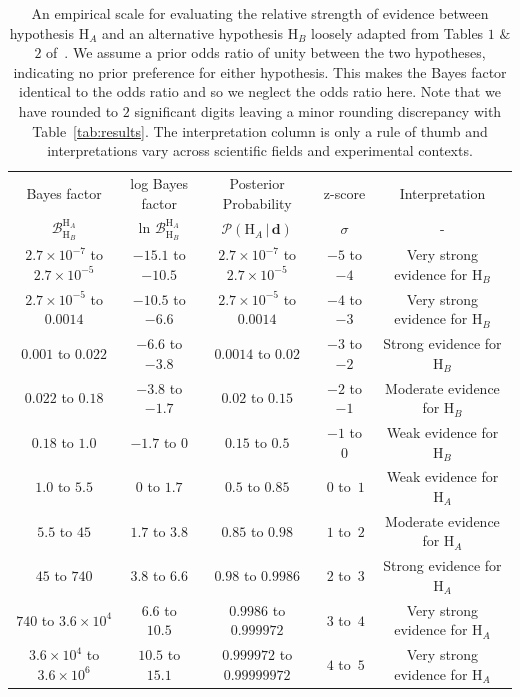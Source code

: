 \newpage
\begin{table}
\centering
\begin{tabularx}{1.0\textwidth}{c|c|c|c|c}
\hline\hline
Bayes factor & log Bayes factor & Posterior Probability & z-score & Interpretation \\
$\mathcal{B}^{\mathrm{H}_A}_{\mathrm{H}_B}$ & ln $\mathcal{B}^{\mathrm{H}_A}_{\mathrm{H}_B}$ & $\mathcal{P} \left(\mathrm{H}_A \, | \, \mathbf{d} \right)$ & $\sigma$ & - \\
\hline\hline
$2.7 \times 10^{-7}$ to $2.7 \times 10^{-5}$ & $-15.1$ to $-10.5$ & $2.7 \times 10^{-7}$ to $2.7 \times 10^{-5}$ & $-5$ to $-4$ & Very strong evidence for $\mathrm{H}_{B}$\\
$2.7 \times 10^{-5}$ to $0.0014$ & $-10.5$ to $-6.6$ & $2.7 \times 10^{-5}$ to $0.0014$ & $-4$ to $-3$ & Very strong evidence for $\mathrm{H}_B$ \\
$0.001$ to $0.022$ & $-6.6$ to $-3.8$ & $0.0014$ to $0.02$ & $-3$ to $-2$ & Strong evidence for $\mathrm{H}_B$ \\
$0.022$ to $0.18$ & $-3.8$ to $-1.7$ & $0.02$ to $0.15$ & $-2$ to $-1$ & Moderate evidence for $\mathrm{H}_B$ \\
$0.18$ to $1.0$ & $-1.7$ to $0$ & $0.15$ to $0.5$ & $-1$ to $0$ & Weak evidence for $\mathrm{H}_B$ \\
$1.0$ to $5.5$ & $0$ to $1.7$ & $0.5$ to $0.85$ & $\, 0$ to $\, 1$ & Weak evidence for $\mathrm{H}_A$ \\
$5.5$ to $45$ & $1.7$ to $3.8$ & $0.85$ to $0.98$ &  $\, 1$ to $\, 2$ & Moderate evidence for $\mathrm{H}_A$ \\
$45$ to $740$ & $3.8$ to $6.6$ & $0.98$ to $0.9986$ & $\, 2$ to $\, 3$ & Strong evidence for $\mathrm{H}_A$ \\
$740$ to $3.6 \times 10^{4}$ & $6.6$ to $10.5$ & $0.9986$ to $0.999972$ &  $\, 3$ to $\, 4$ & Very strong evidence for $\mathrm{H}_A$ \\
$3.6 \times 10^{4}$ to $3.6 \times 10^{6} $ & $10.5$ to $15.1$ & $0.999972$ to $0.99999972$ &  $\, 4$ to $\, 5$ & Very strong evidence for $\mathrm{H}_A$ \\
\hline\hline
\end{tabularx}
\caption{An empirical scale for evaluating the relative strength of evidence between hypothesis $\mathrm{H}_A$ and an alternative hypothesis $\mathrm{H}_B$ loosely adapted from Tables $1$ $\&$ $2$ of~\cite{trotta2008bayes}. We assume a prior odds ratio of unity between the two hypotheses, indicating no prior preference for either hypothesis. This makes the Bayes factor identical to the odds ratio and so we neglect the odds ratio here. Note that we have rounded to $2$ significant digits leaving a minor rounding discrepancy with Table~\ref{tab:results}. The interpretation column is only a rule of thumb and interpretations vary across scientific fields and experimental contexts.}\label{table:bayes_factor_interpretation}
\end{table}


